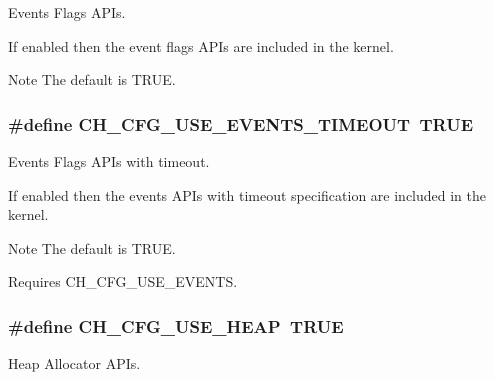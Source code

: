 Events Flags A\+P\+Is. 

If enabled then the event flags A\+P\+Is are included in the kernel.

\begin{DoxyNote}{Note}
The default is {\ttfamily T\+R\+U\+E}. 
\end{DoxyNote}
\hypertarget{group__config_gad39f51eec096df2b73444e8fad5cfd11}{
\subsubsection[{C\+H\+\_\+\+C\+F\+G\+\_\+\+U\+S\+E\+\_\+\+E\+V\+E\+N\+T\+S\+\_\+\+T\+I\+M\+E\+O\+U\+T}]{\setlength{\rightskip}{0pt plus 5cm}\#define C\+H\+\_\+\+C\+F\+G\+\_\+\+U\+S\+E\+\_\+\+E\+V\+E\+N\+T\+S\+\_\+\+T\+I\+M\+E\+O\+U\+T~T\+R\+U\+E}}\label{group__config_gad39f51eec096df2b73444e8fad5cfd11}


Events Flags A\+P\+Is with timeout. 

If enabled then the events A\+P\+Is with timeout specification are included in the kernel.

\begin{DoxyNote}{Note}
The default is {\ttfamily T\+R\+U\+E}. 

Requires {\ttfamily C\+H\+\_\+\+C\+F\+G\+\_\+\+U\+S\+E\+\_\+\+E\+V\+E\+N\+T\+S}. 
\end{DoxyNote}
\hypertarget{group__config_ga0968280d9bbbcda48177d14d77058737}{
\subsubsection[{C\+H\+\_\+\+C\+F\+G\+\_\+\+U\+S\+E\+\_\+\+H\+E\+A\+P}]{\setlength{\rightskip}{0pt plus 5cm}\#define C\+H\+\_\+\+C\+F\+G\+\_\+\+U\+S\+E\+\_\+\+H\+E\+A\+P~T\+R\+U\+E}}\label{group__config_ga0968280d9bbbcda48177d14d77058737}


Heap Allocator A\+P\+Is. 

